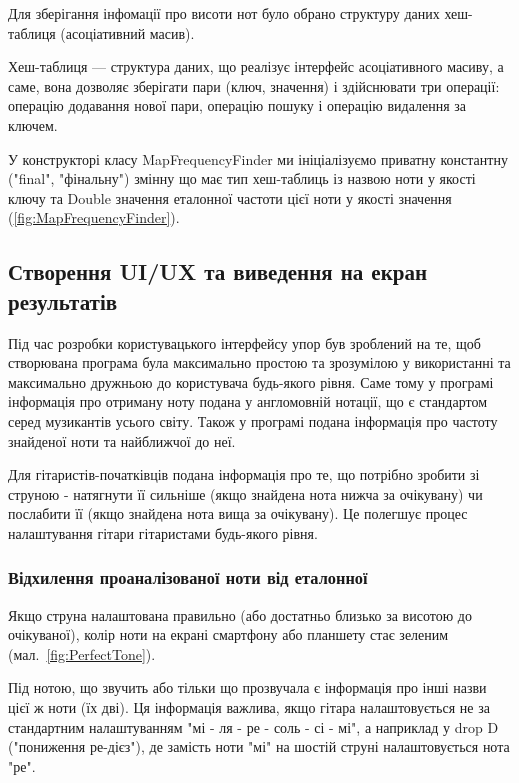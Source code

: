 Для зберігання інфомації про висоти нот було обрано структуру даних хеш-таблиця 
(асоціативний масив).

Хеш-таблиця — структура даних, що реалізує інтерфейс асоціативного масиву, а саме, вона дозволяє зберігати пари (ключ, значення) і здійснювати три операції: операцію додавання нової пари, операцію пошуку і операцію видалення за ключем.

У конструкторі класу MapFrequencyFinder ми ініціалізуємо приватну константну ("final", "фінальну") змінну що має тип хеш-таблиць із назвою ноти у якості ключу та Double значення еталонної частоти цієї ноти у якості значення (\ref{fig:MapFrequencyFinder}).



\subsection{Створення UI/UX та виведення на екран результатів}

Під час розробки користувацького інтерфейсу упор був зроблений на те, щоб створювана програма була максимально простою та зрозумілою у використанні та максимально дружньою до користувача будь-якого рівня. Саме тому у програмі інформація про отриману ноту подана у англомовній нотації, що є стандартом серед музикантів усього світу. Також у програмі подана інформація про частоту знайденої ноти та найближчої до неї.

Для гітаристів-початківців подана інформація про те, що потрібно зробити зі струною - натягнути її сильніше (якщо знайдена нота нижча за очікувану) чи послабити її (якщо знайдена нота вища за очікувану). Це полегшує процес налаштування гітари гітаристами будь-якого рівня.



\subsubsection{Відхилення проаналізованої ноти від еталонної}


Якщо струна налаштована правильно (або достатньо близько за висотою до очікуваної), колір ноти на екрані смартфону або планшету стає зеленим (мал.~\ref{fig:PerfectTone}). 

Під нотою, що звучить або тільки що прозвучала є інформація про інші назви цієї ж ноти (їх дві). Ця інформація важлива, якщо гітара налаштовується не за стандартним налаштуванням "мі - ля - ре - соль - сі - мі", а наприклад у drop D ("пониження ре-дієз"), де замість ноти "мі" на шостій струні налаштовується нота "ре".

